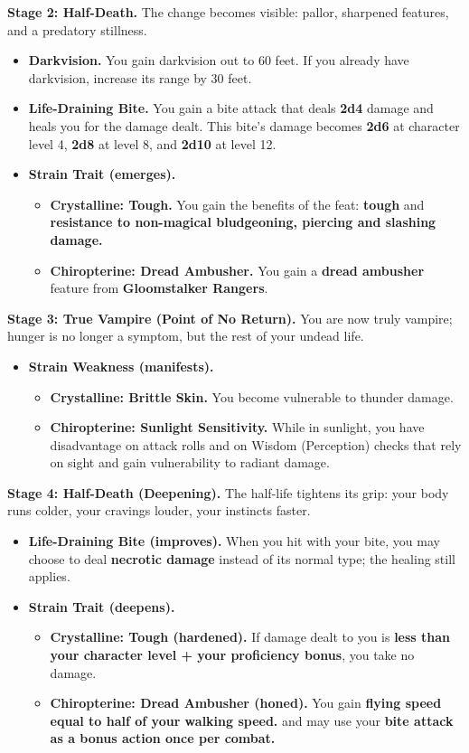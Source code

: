 \textbf{Stage 2: Half-Death.}
The change becomes visible: pallor, sharpened features, and a predatory stillness.
\begin{itemize}
\item \textbf{Darkvision.} You gain darkvision out to 60 feet. If you already have darkvision, increase its range by 30 feet.
\item \textbf{Life-Draining Bite.} You gain a bite attack that deals \textbf{2d4} damage and heals you for the damage dealt. This bite's damage becomes \textbf{2d6} at character level 4, \textbf{2d8} at level 8, and \textbf{2d10} at level 12.
\item \textbf{Strain Trait (emerges).}
\begin{itemize}
\item \textbf{Crystalline: Tough.} You gain the benefits of the feat: \textbf{tough} and \textbf{resistance to non-magical bludgeoning, piercing and slashing damage.}
\item \textbf{Chiropterine: Dread Ambusher.} You gain a \textbf{dread ambusher} feature from \textbf{Gloomstalker Rangers}.
\end{itemize}
\end{itemize}

\textbf{Stage 3: True Vampire (Point of No Return).}
You are now truly vampire; hunger is no longer a symptom, but the rest of your undead life.
\begin{itemize}
\item \textbf{Strain Weakness (manifests).}
\begin{itemize}
\item \textbf{Crystalline: Brittle Skin.} You become vulnerable to thunder damage.
\item \textbf{Chiropterine: Sunlight Sensitivity.} While in sunlight, you have disadvantage on attack rolls and on Wisdom (Perception) checks that rely on sight and gain vulnerability to radiant damage.
\end{itemize}
\end{itemize}

\textbf{Stage 4: Half-Death (Deepening).}
The half-life tightens its grip: your body runs colder, your cravings louder, your instincts faster.
\begin{itemize}
\item \textbf{Life-Draining Bite (improves).} When you hit with your bite, you may choose to deal \textbf{necrotic damage} instead of its normal type; the healing still applies.
\item \textbf{Strain Trait (deepens).}
\begin{itemize}
\item \textbf{Crystalline: Tough (hardened).} If damage dealt to you is \textbf{less than your character level + your proficiency bonus}, you take no damage.
\item \textbf{Chiropterine: Dread Ambusher (honed).} You gain \textbf{flying speed equal to half of your walking speed.} and may use your \textbf{bite attack as a bonus action once per combat.}
\end{itemize}
\end{itemize}

